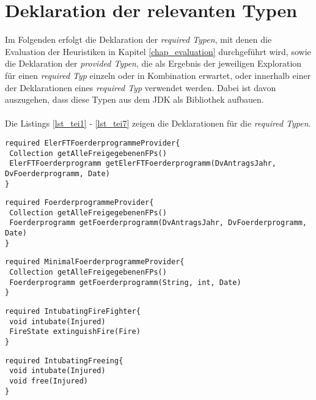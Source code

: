 \chapter{Deklaration der relevanten Typen}\label{app_evalTypes}
Im Folgenden erfolgt die Deklaration der \emph{required Typen}, mit denen die Evaluation der Heuristiken in Kapitel \ref{chap_evaluation} durchgeführt wird, sowie die Deklaration der \emph{provided Typen}, die als Ergebnis der jeweiligen Exploration für einen \emph{required Typ} einzeln oder in Kombination erwartet, oder innerhalb einer der Deklarationen eines \emph{required Typ} verwendet werden. Dabei ist davon auszugehen, dass diese Typen aus dem JDK als Bibliothek aufbauen.
\\\\
Die Listings \ref{lst_tei1} - \ref{lst_tei7} zeigen die Deklarationen für die \emph{required Typen}.
\begin{lstlisting}[style = dsl, caption = Deklaration von ElerFTFoerderprogrammeProvider, captionpos = b, label = lst_tei1]
required ElerFTFoerderprogrammeProvider{
 Collection getAlleFreigegebenenFPs()
 ElerFTFoerderprogramm getElerFTFoerderprogramm(DvAntragsJahr, DvFoerderprogramm, Date)
}
\end{lstlisting}
\begin{lstlisting}[style = dsl, caption = Deklaration von FoerderprogrammeProvider, captionpos = b, label = lst_tei2]
required FoerderprogrammeProvider{
 Collection getAlleFreigegebenenFPs()
 Foerderprogramm getFoerderprogramm(DvAntragsJahr, DvFoerderprogramm, Date)
}
\end{lstlisting}
\newpage
\begin{lstlisting}[style = dsl, caption = Deklaration von MinimalFoerderprogrammeProvider, captionpos = b, label = lst_tei3]
required MinimalFoerderprogrammeProvider{
 Collection getAlleFreigegebenenFPs()
 Foerderprogramm getFoerderprogramm(String, int, Date)
}
\end{lstlisting}
\begin{lstlisting}[style = dsl, caption = Deklaration von IntubatingFireFighter, captionpos = b, label = lst_tei4]
required IntubatingFireFighter{
 void intubate(Injured)
 FireState extinguishFire(Fire)
}
\end{lstlisting}
\begin{lstlisting}[style = dsl, caption = Deklaration von IntubatingFreeing, captionpos = b, label = lst_tei5]
required IntubatingFreeing{
 void intubate(Injured)
 void free(Injured)
}
\end{lstlisting}
